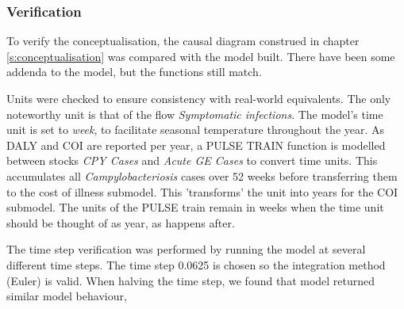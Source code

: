 \subsubsection{Verification}
\label{s:verification}

    
To verify the conceptualisation, the causal diagram construed in chapter \ref{s:conceptualisation} was compared with the model built. There have been some addenda to the model, but the functions still match.  
    
Units were checked to ensure consistency with real-world equivalents. The only noteworthy unit is that of the flow \textit{Symptomatic infections}. The model's time unit is set to \textit{week}, to facilitate seasonal temperature throughout the year. As DALY and COI are reported per year, a PULSE TRAIN function is modelled between stocks \textit{CPY Cases} and \textit{Acute GE Cases} to convert time units. This accumulates all \textit{Campylobacteriosis} cases over 52 weeks before transferring them to the cost of illness submodel. This 'transforms' the unit into years for the COI submodel. The units of the PULSE train remain in weeks when the time unit should be thought of as year, as happens after. 
    
The time step verification was performed by running the model at several different time steps. The time step 0.0625 is chosen so the integration method (Euler) is valid. When halving the time step, we found that model returned similar model behaviour, 


